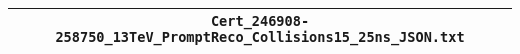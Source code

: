 \begin{center}
\begin{tabular}{c}
\hline\hline
\verb!Cert_246908-258750_13TeV_PromptReco_Collisions15_25ns_JSON.txt!\tabularnewline
\hline
\end{tabular}\end{center}
